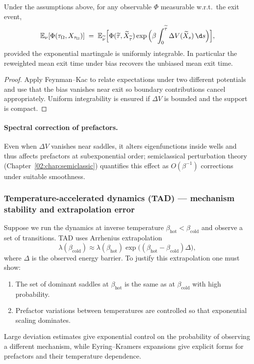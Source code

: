 \begin{proposition}
Under the assumptions above, for any observable $\Phi$ measurable w.r.t.\ the exit event,
\[
\mathbb E_{\nu}[\Phi(\tau_\Omega,X_{\tau_\Omega})] \;=\; \mathbb E_{\widetilde\nu}\Big[ \Phi(\widetilde\tau,\widetilde X_{\widetilde\tau}) \exp\Big(\beta\int_0^{\widetilde\tau}\Delta V(\widetilde X_s)\,\d s\Big)\Big],
\]
provided the exponential martingale is uniformly integrable. In particular the reweighted mean exit time under bias recovers the unbiased mean exit time.
\end{proposition}

\begin{proof}
Apply Feynman--Kac to relate expectations under two different potentials and use that the bias vanishes near exit so boundary contributions cancel appropriately. Uniform integrability is ensured if $\Delta V$ is bounded and the support is compact.
\end{proof}

\paragraph{Spectral correction of prefactors.} Even when $\Delta V$ vanishes near saddles, it alters eigenfunctions inside wells and thus affects prefactors at subexponential order; semiclassical perturbation theory (Chapter~\ref{02:chap:semiclassic}) quantifies this effect as $O(\beta^{-1})$ corrections under suitable smoothness.

\subsubsection*{Temperature-accelerated dynamics (TAD) — mechanism stability and extrapolation error}

Suppose we run the dynamics at inverse temperature $\beta_{\mathrm{hot}}<\beta_{\mathrm{cold}}$ and observe a set of transitions. TAD uses Arrhenius extrapolation
\[
\lambda(\beta_{\mathrm{cold}}) \approx \lambda(\beta_{\mathrm{hot}}) \exp\big((\beta_{\mathrm{hot}}-\beta_{\mathrm{cold}})\Delta\big),
\]
where $\Delta$ is the observed energy barrier. To justify this extrapolation one must show:
\begin{enumerate}
    \item The set of dominant saddles at $\beta_{\mathrm{hot}}$ is the same as at $\beta_{\mathrm{cold}}$ with high probability.
    \item Prefactor variations between temperatures are controlled so that exponential scaling dominates.
\end{enumerate}
Large deviation estimates give exponential control on the probability of observing a different mechanism, while Eyring--Kramers expansions give explicit forms for prefactors and their temperature dependence.

